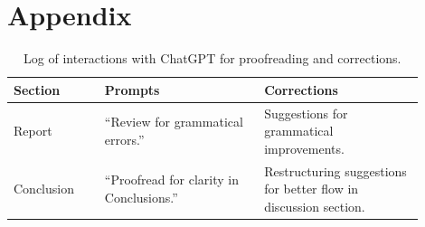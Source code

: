 \documentclass{article}
\begin{document}
\section*{Appendix}

\begin{table}[h]
\centering
\begin{tabular}{|p{0.2\linewidth}|p{0.35\linewidth}|p{0.35\linewidth}|}
\hline
\textbf{Section} & \textbf{Prompts} & \textbf{Corrections} \\
\hline
Report & ``Review for grammatical errors.'' & Suggestions for grammatical improvements. \\
\hline
Conclusion & ``Proofread  for clarity in Conclusions.'' & Restructuring suggestions for better flow in discussion section. \\
\hline
\end{tabular}
\caption{Log of interactions with ChatGPT for proofreading and corrections.}
\label{tab:chatgpt-log}
\end{table}
\end{document}

